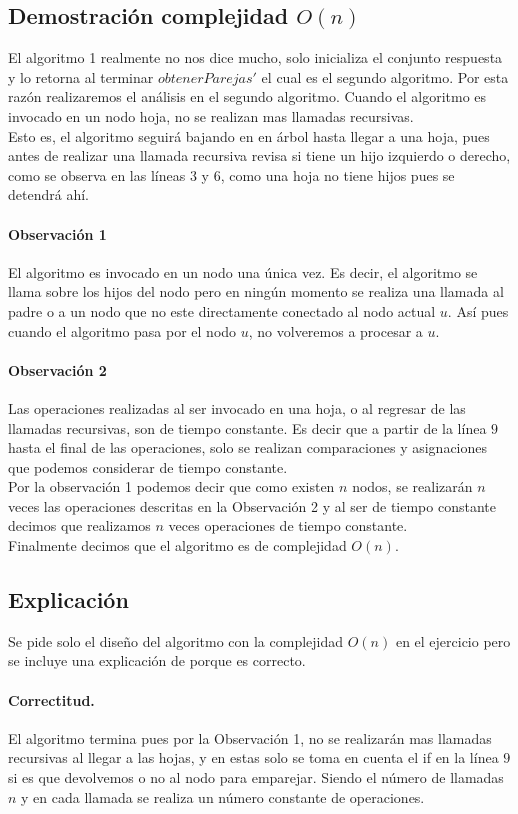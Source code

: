 \documentclass[12pt]{article}
\begin{document}
\subsection{Demostración complejidad $O(n)$}
El algoritmo 1 realmente no nos dice mucho, solo inicializa el conjunto respuesta y lo retorna al terminar $obtenerParejas'$ el cual es el segundo algoritmo. Por esta razón realizaremos el análisis en el segundo algoritmo.
Cuando el algoritmo es invocado en un nodo hoja, no se realizan mas llamadas recursivas.\\
Esto es, el algoritmo seguirá bajando en en árbol hasta llegar a una hoja, pues antes de realizar una llamada recursiva revisa si tiene un hijo izquierdo o derecho, como se observa en las líneas $3$ y $6$, como una hoja no tiene hijos pues se detendrá ahí.\\
\paragraph{Observación 1} El algoritmo es invocado en un nodo una única vez. Es decir, el algoritmo se llama sobre los hijos del nodo pero en ningún momento se realiza una llamada al padre o a un nodo que no este directamente conectado al nodo actual $u$. Así pues cuando el algoritmo pasa por el nodo $u$, no volveremos a procesar a $u$.\\
\paragraph{Observación 2} Las operaciones realizadas al ser invocado en una hoja, o al regresar de las llamadas recursivas, son de tiempo constante. Es decir que a partir de la línea $9$ hasta el final de las operaciones, solo se realizan comparaciones y asignaciones que podemos considerar de tiempo constante.   \\
Por la observación 1 podemos decir que como existen $n$ nodos, se realizarán $n$ veces las operaciones descritas en la Observación 2 y al ser de tiempo constante decimos que realizamos $n$ veces operaciones de tiempo constante. \\
Finalmente decimos que el algoritmo es de complejidad $O(n)$.
\subsection{Explicación} Se pide solo el diseño del algoritmo con la complejidad $O(n)$ en el ejercicio pero se incluye una explicación de porque es correcto.
\paragraph{Correctitud.} 
El algoritmo termina pues por la Observación 1, no se realizarán mas llamadas recursivas al llegar a las hojas, y  en estas solo se toma en cuenta el if en la línea $9$ si es que devolvemos o no al nodo para emparejar. Siendo el número de llamadas $n$ y en cada llamada se realiza un número constante de operaciones.\\
\end{document}
